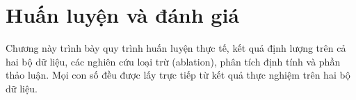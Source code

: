 \chapter{Huấn luyện và đánh giá}
\label{chap:results}

Chương này trình bày quy trình huấn luyện thực tế, kết quả định lượng trên cả hai bộ dữ liệu, các
nghiên cứu loại trừ (ablation), phân tích định tính và phần thảo luận. Mọi con số đều được lấy trực
tiếp từ kết quả thực nghiệm trên hai bộ dữ liệu.





